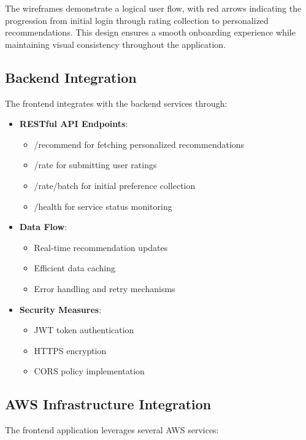 \documentclass[12pt]{article}
\begin{document}
The wireframes demonstrate a logical user flow, with red arrows indicating the progression from initial login through rating collection to personalized recommendations. This design ensures a smooth onboarding experience while maintaining visual consistency throughout the application.

\subsection{Backend Integration}
The frontend integrates with the backend services through:

\begin{itemize}
    \item \textbf{RESTful API Endpoints}:
    \begin{itemize}
        \item /recommend for fetching personalized recommendations
        \item /rate for submitting user ratings
        \item /rate/batch for initial preference collection
        \item /health for service status monitoring
    \end{itemize}
    
    \item \textbf{Data Flow}:
    \begin{itemize}
        \item Real-time recommendation updates
        \item Efficient data caching
        \item Error handling and retry mechanisms
    \end{itemize}
    
    \item \textbf{Security Measures}:
    \begin{itemize}
        \item JWT token authentication
        \item HTTPS encryption
        \item CORS policy implementation
    \end{itemize}
\end{itemize}

\subsection{AWS Infrastructure Integration}
The frontend application leverages several AWS services:
\end{document}
